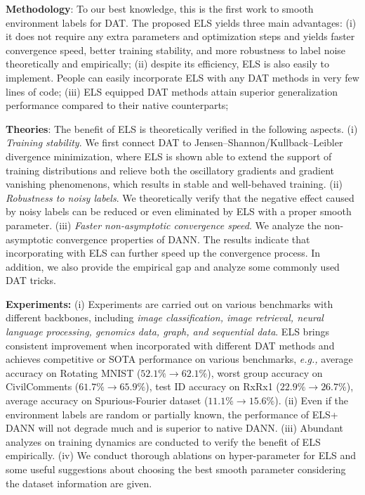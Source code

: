 \documentclass{article} \usepackage{iclr2023_conference,times}
\newcommand{\ls}[0]{ELS\xspace}
\newcommand{\eg}[0]{\textit{e.g., }}
\begin{document}
\textbf{Methodology}: To our best knowledge, this is the first work to smooth environment labels for DAT. The proposed \ls yields three main advantages: (i) it does not require any extra parameters and optimization steps and yields faster convergence speed, better training stability, and more robustness to label noise theoretically and empirically; (ii) despite its efficiency, ELS is also easily to implement. People can easily incorporate ELS with any DAT methods in very few lines of code; (iii) ELS equipped DAT methods attain superior generalization performance compared to their native counterparts;


\textbf{Theories}: The benefit of \ls is theoretically verified in the following aspects. (i) \textit{Training stability}. We first connect DAT to Jensen–Shannon/Kullback–Leibler divergence minimization, where \ls is shown able to extend the support of training distributions and relieve both the oscillatory gradients and gradient vanishing phenomenons, which results in stable and well-behaved training. 
(ii) \textit{Robustness to noisy labels}. We theoretically verify that the negative effect caused by noisy labels can be reduced or even eliminated by \ls with a proper smooth parameter.
(iii) \textit{Faster non-asymptotic convergence speed}. We analyze the non-asymptotic convergence properties of DANN. The results indicate that incorporating with \ls can further speed up the convergence process. 
 In addition, we also provide the empirical gap and analyze some commonly used DAT tricks.



\textbf{Experiments:} (i) Experiments are carried out on various benchmarks with different backbones, including \textit{image classification, image retrieval, neural language processing, genomics data, graph, and sequential data}. \ls brings consistent improvement when incorporated with different DAT methods and achieves competitive or SOTA performance on various benchmarks, \eg average accuracy on Rotating MNIST ($52.1\%\rightarrow 62.1\%$), worst group accuracy on CivilComments ($61.7\%\rightarrow 65.9\%$), test ID accuracy on RxRx1 ($22.9\%\rightarrow 26.7\%$), average accuracy on Spurious-Fourier dataset ($11.1\%\rightarrow 15.6\%$). (ii) Even if the environment labels are random or partially known, the performance of \ls+ DANN  will not degrade much and is superior to native DANN. (iii) Abundant analyzes on training dynamics are conducted to verify the benefit of \ls empirically. (iv) We conduct thorough ablations on hyper-parameter for \ls and some useful suggestions about choosing the best smooth parameter considering the dataset information are given.
\end{document}
